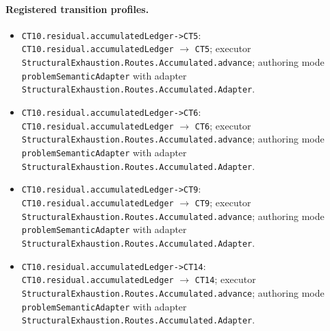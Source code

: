 \paragraph{Registered transition profiles.}
\begin{itemize}
\item \texttt{CT10.\allowbreak{}residual.\allowbreak{}accumulated\allowbreak{}Ledger-\allowbreak{}>CT5}: \texttt{CT10.\allowbreak{}residual.\allowbreak{}accumulated\allowbreak{}Ledger} $\to$ \texttt{CT5}; executor \texttt{Structural\allowbreak{}Exhaustion.\allowbreak{}Routes.\allowbreak{}Accumulated.\allowbreak{}advance}; authoring mode \texttt{problem\allowbreak{}Semantic\allowbreak{}Adapter} with adapter \texttt{Structural\allowbreak{}Exhaustion.\allowbreak{}Routes.\allowbreak{}Accumulated.\allowbreak{}Adapter}.
\item \texttt{CT10.\allowbreak{}residual.\allowbreak{}accumulated\allowbreak{}Ledger-\allowbreak{}>CT6}: \texttt{CT10.\allowbreak{}residual.\allowbreak{}accumulated\allowbreak{}Ledger} $\to$ \texttt{CT6}; executor \texttt{Structural\allowbreak{}Exhaustion.\allowbreak{}Routes.\allowbreak{}Accumulated.\allowbreak{}advance}; authoring mode \texttt{problem\allowbreak{}Semantic\allowbreak{}Adapter} with adapter \texttt{Structural\allowbreak{}Exhaustion.\allowbreak{}Routes.\allowbreak{}Accumulated.\allowbreak{}Adapter}.
\item \texttt{CT10.\allowbreak{}residual.\allowbreak{}accumulated\allowbreak{}Ledger-\allowbreak{}>CT9}: \texttt{CT10.\allowbreak{}residual.\allowbreak{}accumulated\allowbreak{}Ledger} $\to$ \texttt{CT9}; executor \texttt{Structural\allowbreak{}Exhaustion.\allowbreak{}Routes.\allowbreak{}Accumulated.\allowbreak{}advance}; authoring mode \texttt{problem\allowbreak{}Semantic\allowbreak{}Adapter} with adapter \texttt{Structural\allowbreak{}Exhaustion.\allowbreak{}Routes.\allowbreak{}Accumulated.\allowbreak{}Adapter}.
\item \texttt{CT10.\allowbreak{}residual.\allowbreak{}accumulated\allowbreak{}Ledger-\allowbreak{}>CT14}: \texttt{CT10.\allowbreak{}residual.\allowbreak{}accumulated\allowbreak{}Ledger} $\to$ \texttt{CT14}; executor \texttt{Structural\allowbreak{}Exhaustion.\allowbreak{}Routes.\allowbreak{}Accumulated.\allowbreak{}advance}; authoring mode \texttt{problem\allowbreak{}Semantic\allowbreak{}Adapter} with adapter \texttt{Structural\allowbreak{}Exhaustion.\allowbreak{}Routes.\allowbreak{}Accumulated.\allowbreak{}Adapter}.
\end{itemize}
\endgroup
